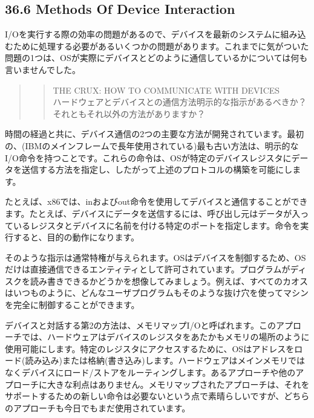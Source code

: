 \hypertarget{methods-of-device-interaction}{%
\subsection*{36.6 Methods Of Device
Interaction}\label{methods-of-device-interaction}}

I/Oを実行する際の効率の問題があるので、デバイスを最新のシステムに組み込むために処理する必要があるいくつかの問題があります。これまでに気がついた問題の1つは、OSが実際にデバイスとどのように通信しているかについては何も言いませんでした。

\begin{quote}
\begin{quote}
THE CRUX: HOW TO COMMUNICATE WITH DEVICES\\
ハードウェアとデバイスとの通信方法明示的な指示があるべきか？それともそれ以外の方法がありますか？
\end{quote}
\end{quote}

時間の経過と共に、デバイス通信の2つの主要な方法が開発されています。最初の、(IBMのメインフレームで長年使用されている)最も古い方法は、明示的なI/O命令を持つことです。これらの命令は、OSが特定のデバイスレジスタにデータを送信する方法を指定し、したがって上述のプロトコルの構築を可能にします。

たとえば、x86では、inおよびout命令を使用してデバイスと通信することができます。たとえば、デバイスにデータを送信するには、呼び出し元はデータが入っているレジスタとデバイスに名前を付ける特定のポートを指定します。命令を実行すると、目的の動作になります。

そのような指示は通常特権が与えられます。OSはデバイスを制御するため、OSだけは直接通信できるエンティティとして許可されています。プログラムがディスクを読み書きできるかどうかを想像してみましょう。例えば、すべてのカオスはいつものように、どんなユーザプログラムもそのような抜け穴を使ってマシンを完全に制御することができます。

デバイスと対話する第2の方法は、メモリマップI/Oと呼ばれます。このアプローチでは、ハードウェアはデバイスのレジスタをあたかもメモリの場所のように使用可能にします。特定のレジスタにアクセスするために、OSはアドレスをロード(読み込み)または格納(書き込み)します。ハードウェアはメインメモリではなくデバイスにロード/ストアをルーティングします。あるアプローチや他のアプローチに大きな利点はありません。メモリマップされたアプローチは、それをサポートするための新しい命令は必要ないという点で素晴らしいですが、どちらのアプローチも今日でもまだ使用されています。

